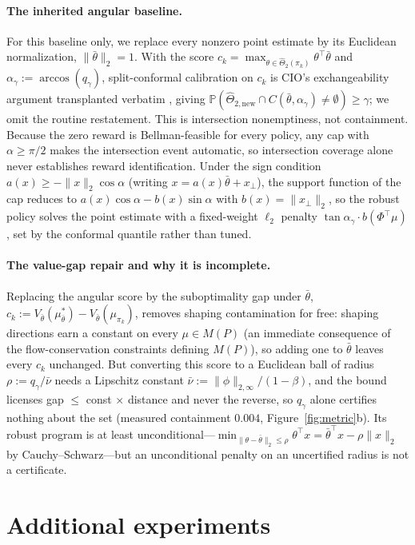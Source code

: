 \documentclass{article}
\begin{document}
\paragraph{The inherited angular baseline.} For this baseline only, we replace
every nonzero point estimate by its Euclidean normalization,
$\|\bar\theta\|_2=1$. With the score
$c_k=\max_{\theta\in\hat\Theta_2(\pi_k)}\theta^\top\bar\theta$ and
$\alpha_\gamma:=\arccos(q_\gamma)$, split-conformal calibration on $c_k$ is
CIO's exchangeability argument transplanted verbatim
\citep{vovk2005algorithmic}, giving
$\mathbb P(\hat\Theta_{2,\mathrm{new}}\cap
C(\bar\theta,\alpha_\gamma)\ne\emptyset)\ge\gamma$; we omit the routine
restatement. This is intersection nonemptiness, not containment. Because the
zero reward is Bellman-feasible for every policy, any cap with $\alpha\ge\pi/2$
makes the intersection event automatic, so intersection coverage alone never
establishes reward identification. Under the sign condition $a(x)\ge-\|x\|_2\cos\alpha$
(writing $x=a(x)\bar\theta+x_\perp$), the support function of the cap reduces to
$a(x)\cos\alpha-b(x)\sin\alpha$ with $b(x)=\|x_\perp\|_2$, so the robust policy
solves the point estimate with a fixed-weight $\ell_2$ penalty
$\tan\alpha_\gamma\cdot b(\Phi^\top\mu)$, set by the conformal quantile rather
than tuned.

\paragraph{The value-gap repair and why it is incomplete.} Replacing the
angular score by the suboptimality gap under $\bar\theta$,
$c_k:=V_{\bar\theta}(\mu^*_{\bar\theta})-V_{\bar\theta}(\mu_{\pi_k})$, removes
shaping contamination for free: shaping directions earn a constant on every
$\mu\in M(P)$ (an immediate consequence of the flow-conservation constraints
defining $M(P)$), so adding one to $\bar\theta$ leaves every $c_k$ unchanged.
But converting this score to a Euclidean ball of radius
$\rho:=q_\gamma/\bar\nu$ needs a Lipschitz constant
$\bar\nu:=\|\phi\|_{2,\infty}/(1-\beta)$, and the bound licenses gap $\le$
const $\times$ distance and never the reverse, so $q_\gamma$ alone certifies
nothing about the set (measured containment $0.004$,
Figure~\ref{fig:metric}b). Its robust program is at least
unconditional---$\min_{\|\theta-\bar\theta\|_2\le\rho}\theta^\top
x=\bar\theta^\top x-\rho\|x\|_2$ by Cauchy--Schwarz---but an unconditional
penalty on an uncertified radius is not a certificate.

\section{Additional experiments}
\label{app:extra}
\end{document}
